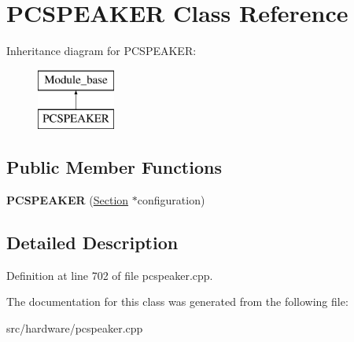 \hypertarget{classPCSPEAKER}{\section{P\-C\-S\-P\-E\-A\-K\-E\-R Class Reference}
\label{classPCSPEAKER}
}
Inheritance diagram for P\-C\-S\-P\-E\-A\-K\-E\-R\-:\begin{figure}[H]
\begin{center}
\leavevmode
\includegraphics[height=2.000000cm]{classPCSPEAKER}
\end{center}
\end{figure}
\subsection*{Public Member Functions}
\begin{DoxyCompactItemize}
\item 
\hypertarget{classPCSPEAKER_a7c610f8af87ac405537da150878488aa}{{\bfseries P\-C\-S\-P\-E\-A\-K\-E\-R} (\hyperlink{classSection}{Section} $\ast$configuration)}\label{classPCSPEAKER_a7c610f8af87ac405537da150878488aa}

\end{DoxyCompactItemize}


\subsection{Detailed Description}


Definition at line 702 of file pcspeaker.\-cpp.



The documentation for this class was generated from the following file\-:\begin{DoxyCompactItemize}
\item 
src/hardware/pcspeaker.\-cpp\end{DoxyCompactItemize}
